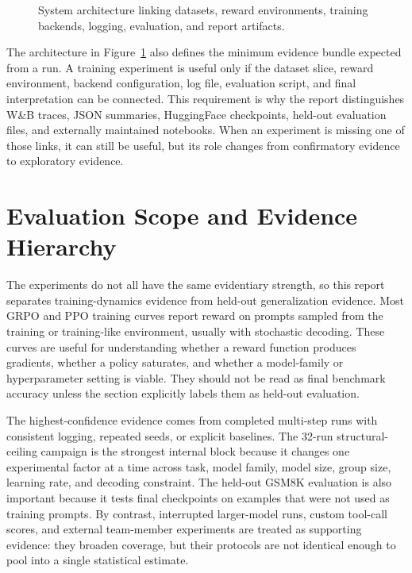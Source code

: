 \documentclass[12pt,a4paper]{report}
\newcommand{\fitdiagram}[1]{\resizebox{\textwidth}{!}{}}
\begin{document}
\begin{figure}[ht]
  \centering
  \fitdiagram{tikz/system_architecture.tex}
  \caption{System architecture linking datasets, reward environments, training backends, logging, evaluation, and report artifacts.}
  \label{fig:system-architecture}
\end{figure}

The architecture in Figure~\ref{fig:system-architecture} also defines the minimum evidence bundle expected from a run. A training experiment is useful only if the dataset slice, reward environment, backend configuration, log file, evaluation script, and final interpretation can be connected. This requirement is why the report distinguishes W\&B traces, JSON summaries, HuggingFace checkpoints, held-out evaluation files, and externally maintained notebooks. When an experiment is missing one of those links, it can still be useful, but its role changes from confirmatory evidence to exploratory evidence.

\section{Evaluation Scope and Evidence Hierarchy}
\label{sec:evidence-hierarchy}

The experiments do not all have the same evidentiary strength, so this report separates training-dynamics evidence from held-out generalization evidence. Most GRPO and PPO training curves report reward on prompts sampled from the training or training-like environment, usually with stochastic decoding. These curves are useful for understanding whether a reward function produces gradients, whether a policy saturates, and whether a model-family or hyperparameter setting is viable. They should not be read as final benchmark accuracy unless the section explicitly labels them as held-out evaluation.

The highest-confidence evidence comes from completed multi-step runs with consistent logging, repeated seeds, or explicit baselines. The 32-run structural-ceiling campaign is the strongest internal block because it changes one experimental factor at a time across task, model family, model size, group size, learning rate, and decoding constraint. The held-out GSM8K evaluation is also important because it tests final checkpoints on examples that were not used as training prompts. By contrast, interrupted larger-model runs, custom tool-call scores, and external team-member experiments are treated as supporting evidence: they broaden coverage, but their protocols are not identical enough to pool into a single statistical estimate.
\end{document}
